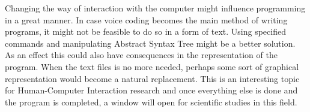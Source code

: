 Changing the way of interaction with the computer might influence programming in a great manner. In case voice coding becomes the main method of writing programs, it might not be feasible to do so in a form of text. Using specified commands and manipulating Abstract Syntax Tree might be a better solution. As an effect this could also have consequences in the representation of the program. When the text files is no more needed, perhaps some sort of graphical representation would become a natural replacement. This is an interesting topic for Human-Computer Interaction research and once everything else is done and the program is completed, a window will open for scientific studies in this field.